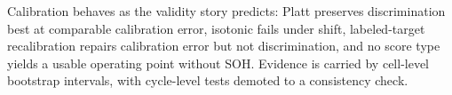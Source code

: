 Calibration behaves as the validity story predicts: Platt preserves discrimination best at comparable calibration error, isotonic fails under shift, labeled-target recalibration repairs calibration error but not discrimination, and no score type yields a usable operating point without SOH. Evidence is carried by cell-level bootstrap intervals, with cycle-level tests demoted to a consistency check.

